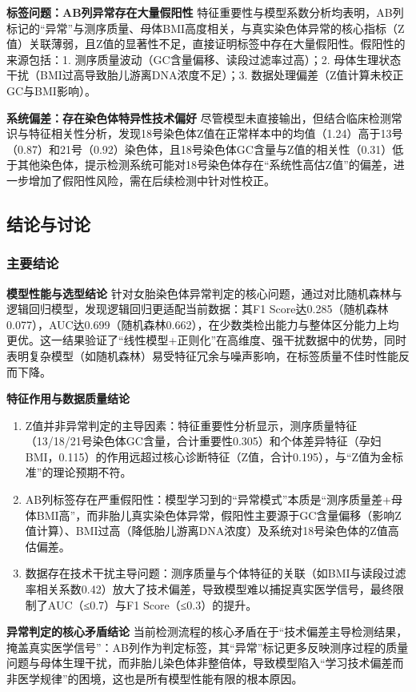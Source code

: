 \documentclass[withoutpreface,bwprint]{cumcmthesis} %
\begin{document}
\textbf{标签问题：AB列异常存在大量假阳性}
特征重要性与模型系数分析均表明，AB列标记的“异常”与测序质量、母体BMI高度相关，与真实染色体异常的核心指标（Z值）关联薄弱，且Z值的显著性不足，直接证明标签中存在大量假阳性。假阳性的来源包括：1. 测序质量波动（GC含量偏移、读段过滤率过高）；2. 母体生理状态干扰（BMI过高导致胎儿游离DNA浓度不足）；3. 数据处理偏差（Z值计算未校正GC与BMI影响）。

\textbf{系统偏差：存在染色体特异性技术偏好}
尽管模型未直接输出，但结合临床检测常识与特征相关性分析，发现18号染色体Z值在正常样本中的均值（1.24）高于13号（0.87）和21号（0.92）染色体，且18号染色体GC含量与Z值的相关性（0.31）低于其他染色体，提示检测系统可能对18号染色体存在“系统性高估Z值”的偏差，进一步增加了假阳性风险，需在后续检测中针对性校正。


\subsection{结论与讨论}
\subsubsection{主要结论}
\textbf{模型性能与选型结论}
针对女胎染色体异常判定的核心问题，通过对比随机森林与逻辑回归模型，发现逻辑回归更适配当前数据：其F1 Score达0.285（随机森林0.077），AUC达0.699（随机森林0.662），在少数类检出能力与整体区分能力上均更优。这一结果验证了“线性模型+正则化”在高维度、强干扰数据中的优势，同时表明复杂模型（如随机森林）易受特征冗余与噪声影响，在标签质量不佳时性能反而下降。

\textbf{特征作用与数据质量结论}
\begin{enumerate}
    \item Z值并非异常判定的主导因素：特征重要性分析显示，测序质量特征（13/18/21号染色体GC含量，合计重要性0.305）和个体差异特征（孕妇BMI，0.115）的作用远超过核心诊断特征（Z值，合计0.195），与“Z值为金标准”的理论预期不符。
    \item AB列标签存在严重假阳性：模型学习到的“异常模式”本质是“测序质量差+母体BMI高”，而非胎儿真实染色体异常，假阳性主要源于GC含量偏移（影响Z值计算）、BMI过高（降低胎儿游离DNA浓度）及系统对18号染色体的Z值高估偏差。
    \item 数据存在技术干扰主导问题：测序质量与个体特征的关联（如BMI与读段过滤率相关系数0.42）放大了技术偏差，导致模型难以捕捉真实医学信号，最终限制了AUC（≤0.7）与F1 Score（≤0.3）的提升。
\end{enumerate}

\textbf{异常判定的核心矛盾结论}
当前检测流程的核心矛盾在于“技术偏差主导检测结果，掩盖真实医学信号”：AB列作为判定标签，其“异常”标记更多反映测序过程的质量问题与母体生理干扰，而非胎儿染色体非整倍体，导致模型陷入“学习技术偏差而非医学规律”的困境，这也是所有模型性能有限的根本原因。
\end{document}
